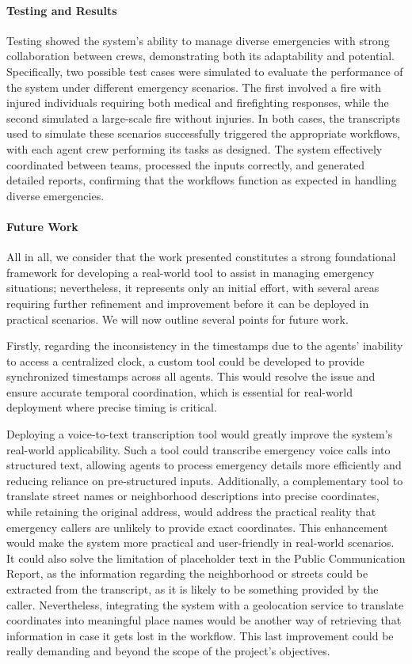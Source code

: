\documentclass[a4paper]{article}
\begin{document}
\paragraph{Testing and Results}
Testing showed the system's ability to manage diverse emergencies with strong collaboration between crews, demonstrating both its adaptability and potential. Specifically, two possible test cases were simulated to evaluate the performance of the system under different emergency scenarios. The first involved a fire with injured individuals requiring both medical and firefighting responses, while the second simulated a large-scale fire without injuries. In both cases, the transcripts used to simulate these scenarios successfully triggered the appropriate workflows, with each agent crew performing its tasks as designed. The system effectively coordinated between teams, processed the inputs correctly, and generated detailed reports, confirming that the workflows function as expected in handling diverse emergencies.

\paragraph{Future Work}
All in all, we consider that the work presented constitutes a strong foundational framework for developing a real-world tool to assist in managing emergency situations; nevertheless, it represents only an initial effort, with several areas requiring further refinement and improvement before it can be deployed in practical scenarios. We will now outline several points for future work.

Firstly, regarding the inconsistency in the timestamps due to the agents' inability to access a centralized clock, a custom tool could be developed to provide synchronized timestamps across all agents. This would resolve the issue and ensure accurate temporal coordination, which is essential for real-world deployment where precise timing is critical.

Deploying a voice-to-text transcription tool would greatly improve the system's real-world applicability. Such a tool could transcribe emergency voice calls into structured text, allowing agents to process emergency details more efficiently and reducing reliance on pre-structured inputs. Additionally, a complementary tool to translate street names or neighborhood descriptions into precise coordinates, while retaining the original address, would address the practical reality that emergency callers are unlikely to provide exact coordinates. This enhancement would make the system more practical and user-friendly in real-world scenarios. It could also solve the limitation of placeholder text in the Public Communication Report, as the information regarding the neighborhood or streets could be extracted from the transcript, as it is likely to be something provided by the caller. Nevertheless, integrating the system with a geolocation service to translate coordinates into meaningful place names would be another way of retrieving that information in case it gets lost in the workflow. This last improvement could be really demanding and beyond the scope of the project's objectives.
\end{document}
